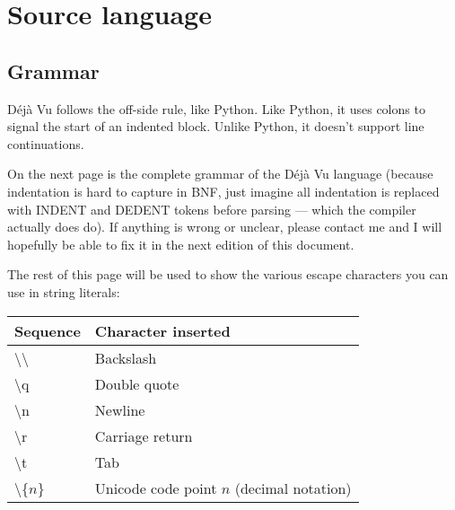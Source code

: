 \chapter{Source language}

\newcommand\grammar[1]{\underline{#1}}

\section{Grammar}
Déjà Vu follows the off-side rule, like Python. Like Python, it uses colons to signal the start of an indented block. Unlike Python, it doesn't support line continuations.

On the next page is the complete grammar of the Déjà Vu language (because indentation is hard to capture in BNF, just imagine all indentation is replaced with INDENT and DEDENT tokens before parsing --- which the compiler actually does do). If anything is wrong or unclear, please contact me and I will hopefully be able to fix it in the next edition of this document.

The rest of this page will be used to show the various escape characters you can use in string literals:

\begin{tabular}{ l l }
\textbf{Sequence} & \textbf{Character inserted}\\
\hline
\textbackslash{}\textbackslash{} & Backslash\\
\textbackslash{}q & Double quote\\
\textbackslash{}n & Newline\\
\textbackslash{}r & Carriage return\\
\textbackslash{}t & Tab\\
\textbackslash{}\{$n$\} & Unicode code point $n$ (decimal notation)\\
\end{tabular}


